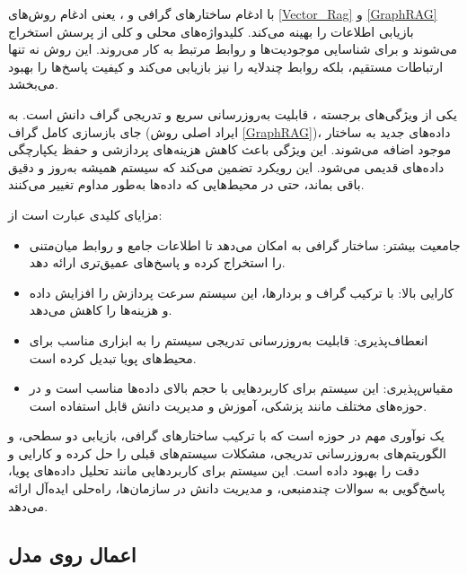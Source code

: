 \documentclass[11pt, a4paper, oneside]{book}
\begin{document}
				با ادغام ساختارهای گرافی و ، یعنی ادغام روش‌های \ref{Vector_Rag} و \ref{GraphRAG} بازیابی اطلاعات را بهینه می‌کند. کلیدواژه‌های محلی و کلی از پرسش استخراج می‌شوند و برای شناسایی موجودیت‌ها و روابط مرتبط به کار می‌روند. این روش نه تنها ارتباطات مستقیم، بلکه روابط چندلایه را نیز بازیابی می‌کند و کیفیت پاسخ‌ها را بهبود می‌بخشد.
				

				یکی از ویژگی‌های برجسته ، قابلیت به‌روزرسانی سریع و تدریجی گراف دانش است. به جای بازسازی کامل گراف (ایراد اصلی روش \ref{GraphRAG})، داده‌های جدید به ساختار موجود اضافه می‌شوند. این ویژگی باعث کاهش هزینه‌های پردازشی و حفظ یکپارچگی داده‌های قدیمی می‌شود. این رویکرد تضمین می‌کند که سیستم همیشه به‌روز و دقیق باقی بماند، حتی در محیط‌هایی که داده‌ها به‌طور مداوم تغییر می‌کنند. 
				
				مزایای کلیدی  عبارت است از:
				
				\begin{itemize}
					
					\item {\large جامعیت بیشتر}:
					ساختار گرافی به  امکان می‌دهد تا اطلاعات جامع و روابط میان‌متنی را استخراج کرده و پاسخ‌های عمیق‌تری ارائه دهد.
					
					\item {\large کارایی بالا}:
					با ترکیب گراف و بردارها، این سیستم سرعت پردازش را افزایش داده و هزینه‌ها را کاهش می‌دهد.
					
					\item {\large انعطاف‌پذیری}:
					قابلیت به‌روزرسانی تدریجی سیستم را به ابزاری مناسب برای محیط‌های پویا تبدیل کرده است.
					
					\item {\large مقیاس‌پذیری}:
					این سیستم برای کاربردهایی با حجم بالای داده‌ها مناسب است و در حوزه‌های مختلف مانند پزشکی، آموزش و مدیریت دانش قابل استفاده است.
					
				\end{itemize}


				یک نوآوری مهم در حوزه  است که با ترکیب ساختارهای گرافی، بازیابی دو سطحی، و الگوریتم‌های به‌روزرسانی تدریجی، مشکلات سیستم‌های قبلی را حل کرده و کارایی و دقت را بهبود داده است. این سیستم برای کاربردهایی مانند تحلیل داده‌های پویا، پاسخ‌گویی به سوالات چندمنبعی، و مدیریت دانش در سازمان‌ها، راه‌حلی ایده‌آل ارائه می‌دهد. \cite{guo_lightrag_2024}
				
			\subsection{اعمال  روی مدل}
			
\end{document}
